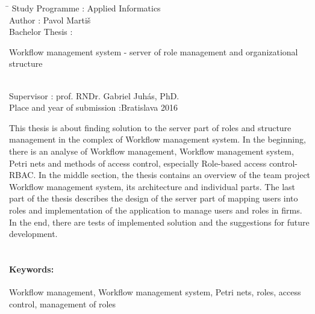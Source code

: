 \documentclass[12pt, oneside]{book}
\def\mfautor{Pavol Martiš}
\begin{document}
\begin{tabbing}	
	\hspace*{7cm}\= \kill
	Study Programme :\> Applied Informatics\\
	Author :\> \mfautor\\
	Bachelor Thesis :\>
	\begin{minipage}[t]{20em}
	Workflow management system - server of role management
	and organizational structure
	\end{minipage} \\
	Supervisor :\> prof. RNDr. Gabriel Juhás, PhD.\\
	
	Place and year of submission :\>Bratislava 2016
\end{tabbing}
This thesis is about finding solution to the server part of roles and structure management
in the complex of Workflow management system.
In the beginning, there is an analyse of Workflow management, Workflow management system, Petri nets 
and methods of access control, especially Role-based access control- RBAC.
In the middle section, the thesis contains an overview of the team project Workflow management system,
its architecture and individual parts.
The last part of the thesis describes the design of the server part of 
mapping users into roles and implementation of the application to manage users and roles in firms. 
In the end, there are tests of implemented solution and the suggestions for future development.\\ \\


\paragraph*{Keywords:}  Workflow management, Workflow management system, Petri nets, roles, access control, management of roles


%
%
\end{document}
